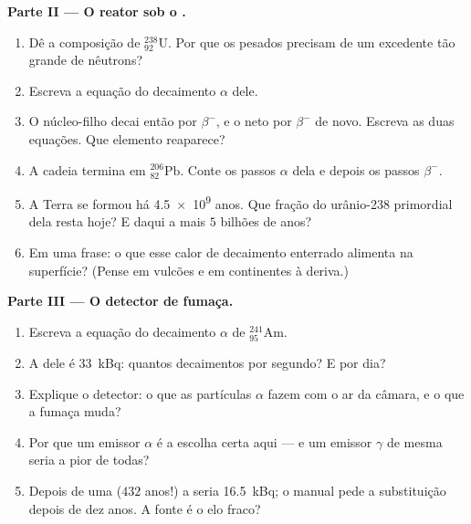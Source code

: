 \begin{problem}
\medskip
\noindent\textbf{Parte II --- O reator sob o .}
\begin{enumerate}[resume]
  \item Dê a composição de ${}^{238}_{92}\mathrm{U}$. Por que os 
        pesados precisam de um excedente tão grande de nêutrons?
  \item Escreva a equação do decaimento $\alpha$ dele.
  \item O núcleo-filho decai então por $\beta^-$, e o neto por $\beta^-$
        de novo. Escreva as duas equações. Que elemento reaparece?
  \item A cadeia termina em ${}^{206}_{82}\mathrm{Pb}$. Conte os passos
        $\alpha$ dela e depois os passos $\beta^-$.
  \item A Terra se formou há \num{4.5e9} anos. Que fração do urânio-238
        primordial dela resta hoje? E daqui a mais $5$ bilhões de anos?
  \item Em uma frase: o que esse calor de decaimento enterrado alimenta na
        superfície? (Pense em vulcões e em continentes à deriva.)
\end{enumerate}

\medskip
\noindent\textbf{Parte III --- O detector de fumaça.}
\begin{enumerate}[resume]
  \item Escreva a equação do decaimento $\alpha$ de
        ${}^{241}_{95}\mathrm{Am}$.
  \item A  dele é \qty{33}{kBq}: quantos decaimentos por
        segundo? E por dia?
  \item Explique o detector: o que as partículas $\alpha$ fazem com o ar
        da câmara, e o que a fumaça muda?
  \item Por que um emissor $\alpha$ é a escolha certa aqui --- e um
        emissor $\gamma$ de mesma  seria a pior de todas?
  \item Depois de uma  ($432$ anos!) a  seria
        \qty{16.5}{kBq}; o manual pede a substituição depois de dez anos.
        A fonte é o elo fraco?
\end{enumerate}


\end{problem}
